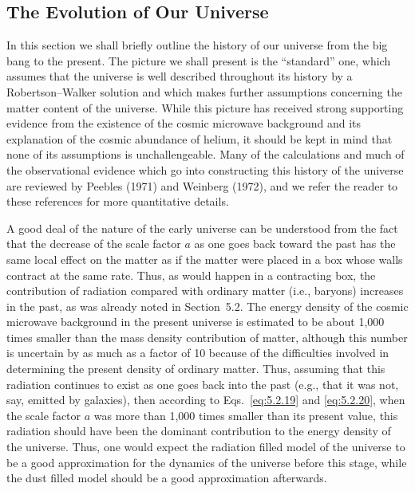 
\subsection{The Evolution of Our Universe}\label{sec:5.4}

In this section we shall briefly outline the history of our universe from the big bang
to the present. The picture we shall present is the ``standard'' one, which assumes that
the universe is well described throughout its history by a Robertson--Walker solution
and which makes further assumptions concerning the matter content of the universe.
While this picture has received strong supporting evidence from the existence of the
cosmic microwave background and its explanation of the cosmic abundance of helium,
it should be kept in mind that none of its assumptions is unchallengeable. Many of
the calculations and much of the observational evidence which go into constructing
this history of the universe are reviewed by Peebles (1971) and Weinberg (1972), and
we refer the reader to these references for more quantitative details.

A good deal of the nature of the early universe can be understood from the fact that
the decrease of the scale factor \(a\) as one goes back toward the past has the same
local effect on the matter as if the matter were placed in a box whose walls contract
at the same rate. Thus, as would happen in a contracting box, the contribution of
radiation compared with ordinary matter (i.e., baryons) increases in the past, as was
already noted in Section~5.2. The energy density of the cosmic microwave background
in the present universe is estimated to be about 1,000 times smaller than the mass
density contribution of matter, although this number is uncertain by as much as a
factor of 10 because of the difficulties involved in determining the present density of
ordinary matter. Thus, assuming that this radiation continues to exist as one goes back
into the past (e.g., that it was not, say, emitted by galaxies), then according to
Eqs.~\eqref{eq:5.2.19} and \eqref{eq:5.2.20}, when the scale factor \(a\) was more
than 1,000 times smaller than its present value, this radiation should have been the
dominant contribution to the energy density of the universe. Thus, one would expect
the radiation filled model of the universe to be a good approximation for the dynamics
of the universe before this stage, while the dust filled model should be a good
approximation afterwards.


